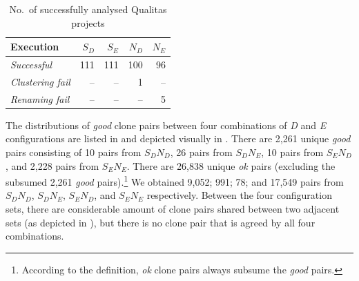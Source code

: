 \documentclass{sig-alternate-05-2015}
\newcommand\FIXME[1]{\textbf{FIXME: #1}}
\begin{document}
\begin{table}
	\centering
	\caption{No.~of successfully analysed Qualitas projects}
	\label{tab:projects_missing}
	\small
	\begin{tabular}{l|r|r|r|r}
		\hline
		Execution & $S_D$ & $S_E$  & $N_D$ & $N_E$ \\ 
		\hline
		\textit{Successful} & 111 & 111 & 100 & 96 \\ 
		\textit{Clustering fail} & -- & -- & 1 & -- \\
		\textit{Renaming fail} & -- &  -- & -- & 5 \\
		\hline
	\end{tabular}
\end{table}

\begin{table}
	\centering
	\caption{Distribution of agreed clone pairs}
	\label{t_agreed_good_clone_pairs}
	\small
\end{table}

The distributions of \textit{good} clone pairs between four combinations of \textit{D} and \textit{E} configurations are listed in  and depicted visually in . There are 2,261 unique \textit{good} pairs consisting of 10 pairs from $S_DN_D$, 26 pairs from $S_DN_E$, 10 pairs from $S_EN_D$, and 2,228 pairs from $S_EN_E$. There are 26,838 unique \textit{ok} pairs (excluding the subsumed 2,261 \textit{good} pairs).\footnote{According to the definition, \textit{ok} clone pairs always subsume the \textit{good} pairs.} We obtained 9,052; 991; 78; and 17,549 pairs from $S_DN_D$, $S_DN_E$, $S_EN_D$, and $S_EN_E$ respectively. Between the four configuration sets, there are considerable amount of clone pairs shared between two adjacent sets (as depicted in ), but there is no clone pair that is agreed by all four combinations. %

\end{document}
